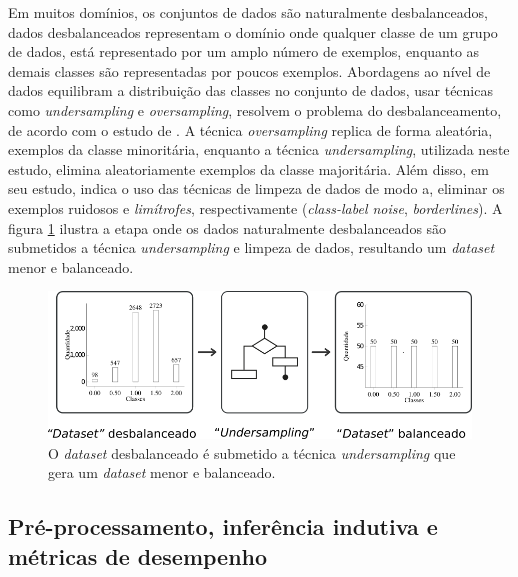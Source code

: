 Em muitos domínios, os conjuntos de dados são naturalmente desbalanceados, 
dados desbalanceados representam o domínio onde qualquer classe de um grupo 
de dados, está representado por um amplo número de exemplos, enquanto as demais 
classes são representadas por poucos exemplos. Abordagens ao nível de dados 
equilibram a distribuição das classes no conjunto de dados, usar técnicas como 
\textit{undersampling} e \textit{oversampling}, resolvem o problema do 
desbalanceamento, de acordo com o estudo de . A 
técnica \textit{oversampling} replica de forma aleatória, exemplos da classe 
minoritária, enquanto a técnica \textit{undersampling}, utilizada neste estudo, 
elimina aleatoriamente exemplos da classe majoritária. Além disso, 
 em seu estudo, indica o uso das técnicas de 
limpeza de dados de modo a, eliminar os exemplos ruidosos e \textit{limítrofes}, 
respectivamente (\textit{class-label noise}, \textit{borderlines}). A figura 
\ref{figure:metodologia_2} ilustra a etapa onde os dados naturalmente 
desbalanceados são submetidos a técnica \textit{undersampling} e limpeza de 
dados, resultando um \textit{dataset} menor e balanceado.

\begin{figure}[H]
\begin{center}
    \includegraphics[scale=0.60]{images/metodologia_2.png}
\end{center}
\caption{O \textit{dataset} desbalanceado é submetido a técnica
\textit{undersampling} que gera um \textit{dataset} menor e balanceado.}
\label{figure:metodologia_2}
\end{figure}

\subsection{Pré-processamento, inferência indutiva e métricas de desempenho}
\label{subsection:pre_processamento}

